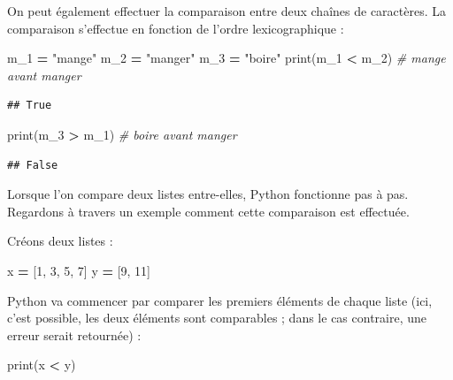 \documentclass[12pt,]{book}
\newenvironment{Shaded}{\begin{snugshade}}{\end{snugshade}}
\newcommand{\DecValTok}[1]{\textcolor[rgb]{0.00,0.00,0.81}{#1}}
\newcommand{\StringTok}[1]{\textcolor[rgb]{0.31,0.60,0.02}{#1}}
\newcommand{\CommentTok}[1]{\textcolor[rgb]{0.56,0.35,0.01}{\textit{#1}}}
\newcommand{\OperatorTok}[1]{\textcolor[rgb]{0.81,0.36,0.00}{\textbf{#1}}}
\newcommand{\BuiltInTok}[1]{#1}
\newcommand{\NormalTok}[1]{#1}
\numberwithin{equation}{section}
\numberwithin{countremarque}{section}
\begin{document}
On peut également effectuer la comparaison entre deux chaînes de
caractères. La comparaison s'effectue en fonction de l'ordre
lexicographique :

\begin{Shaded}
\begin{Highlighting}[]
\NormalTok{m_1 }\OperatorTok{=} \StringTok{"mange"}
\NormalTok{m_2 }\OperatorTok{=} \StringTok{"manger"}
\NormalTok{m_3 }\OperatorTok{=} \StringTok{"boire"}
\BuiltInTok{print}\NormalTok{(m_1 }\OperatorTok{<}\NormalTok{ m_2) }\CommentTok{# mange avant manger}
\end{Highlighting}
\end{Shaded}

\begin{lstlisting}
## True
\end{lstlisting}

\begin{Shaded}
\begin{Highlighting}[]
\BuiltInTok{print}\NormalTok{(m_3 }\OperatorTok{>}\NormalTok{ m_1) }\CommentTok{# boire avant manger}
\end{Highlighting}
\end{Shaded}

\begin{lstlisting}
## False
\end{lstlisting}

Lorsque l'on compare deux listes entre-elles, Python fonctionne pas à
pas. Regardons à travers un exemple comment cette comparaison est
effectuée.

Créons deux listes :

\begin{Shaded}
\begin{Highlighting}[]
\NormalTok{x }\OperatorTok{=}\NormalTok{ [}\DecValTok{1}\NormalTok{, }\DecValTok{3}\NormalTok{, }\DecValTok{5}\NormalTok{, }\DecValTok{7}\NormalTok{]}
\NormalTok{y }\OperatorTok{=}\NormalTok{ [}\DecValTok{9}\NormalTok{, }\DecValTok{11}\NormalTok{]}
\end{Highlighting}
\end{Shaded}

Python va commencer par comparer les premiers éléments de chaque liste
(ici, c'est possible, les deux éléments sont comparables ; dans le cas
contraire, une erreur serait retournée) :

\begin{Shaded}
\begin{Highlighting}[]
\BuiltInTok{print}\NormalTok{(x }\OperatorTok{<}\NormalTok{ y)}
\end{Highlighting}
\end{Shaded}
\end{document}
